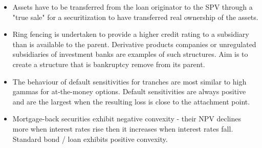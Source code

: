 \begin{itemize}
	\item Assets have to be transferred from the loan originator to the SPV through a "true sale" for a securitization to have transferred real ownership of the assets.
	\item Ring fencing is undertaken to provide a higher credit rating to a subsidiary than is available to the parent. Derivative products companies or unregulated subsidiaries of investment banks are examples of such structures. Aim is to create a structure that is bankruptcy remove from its parent. 
	\item The behaviour of default sensitivities for tranches are most similar to high gammas for at-the-money options. Default sensitivities are always positive and are the largest when the resulting loss is close to the attachment point.
	\item Mortgage-back securities exhibit negative convexity - their NPV declines more when interest rates rise then it increases when interest rates fall. Standard bond / loan exhibits positive convexity.
\end{itemize}

